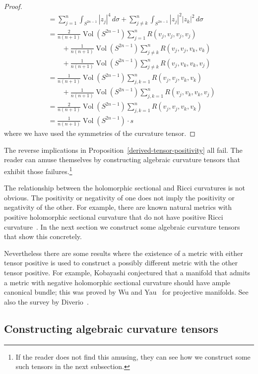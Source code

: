\documentclass[11pt]{article}
\theoremstyle{definition}
\DeclareMathOperator{\Vol}{Vol}
\begin{document}
\begin{proof}
\begin{align*}
&= \sum_{j=1}^n \int_{S^{2n-1}} |z_j|^4 \, d\sigma
+ \sum_{j \not= k}^n \int_{S^{2n-1}} |z_j|^2|z_k|^2 \, d\sigma
\\
&= \frac{2}{n(n+1)} \Vol(S^{2n-1}) \sum_{j=1}^n R(v_j,v_j,v_j,v_j)
\\
&\qquad{}+ \frac{1}{n(n+1)} \Vol(S^{2n-1}) \sum_{j \not= k}^n R(v_j,v_j,v_k,v_k)
\\
&\qquad{}+
\frac{1}{n(n+1)} \Vol(S^{2n-1}) \sum_{j \not= k}^n R(v_j,v_k,v_k,v_j)
\\
&= \frac{1}{n(n+1)} \Vol(S^{2n-1}) \sum_{j,k=1}^n R(v_j,v_j,v_k,v_k)
\\
&\qquad{}+
\frac{1}{n(n+1)} \Vol(S^{2n-1}) \sum_{j,k=1}^n R(v_j,v_k,v_k,v_j)
\\
&= \frac{2}{n(n+1)} \Vol(S^{2n-1}) \sum_{j,k=1}^n R(v_j,v_j,v_k,v_k)
\\
&= \frac{1}{n(n+1)} \Vol(S^{2n-1}) \cdot s
\end{align*}
where we have used the symmetries of the curvature tensor.
\end{proof}


The reverse implications in Proposition~\ref{derived-tensor-positivity} all fail. The reader can amuse themselves by constructing algebraic curvature tensors that exhibit those failures.\footnote{If the reader does not find this amusing, they can see how we construct some such tensors in the next subsection.}

The relationship between the holomorphic sectional and Ricci curvatures is not obvious. The positivity or negativity of one does not imply the positivity or negativity of the other. For example, there are known natural metrics with positive holomorphic sectional curvature that do not have positive Ricci curvature~\cite{hitchin1975curvature,yang2019hirzebruch}. In the next section we construct some algebraic curvature tensors that show this concretely.

Nevertheless there are some results where the existence of a metric with either tensor positive is used to construct a possibly different metric with the other tensor positive. For example, Kobayashi conjectured that a manifold that admits a metric with negative holomorphic sectional curvature should have ample canonical bundle; this was proved by Wu and Yau~\cite{wu2016negative} for projective manifolds. See also the survey by Diverio~\cite{diverio2020kobayashi}.


\subsection{Constructing algebraic curvature tensors}
\end{document}
